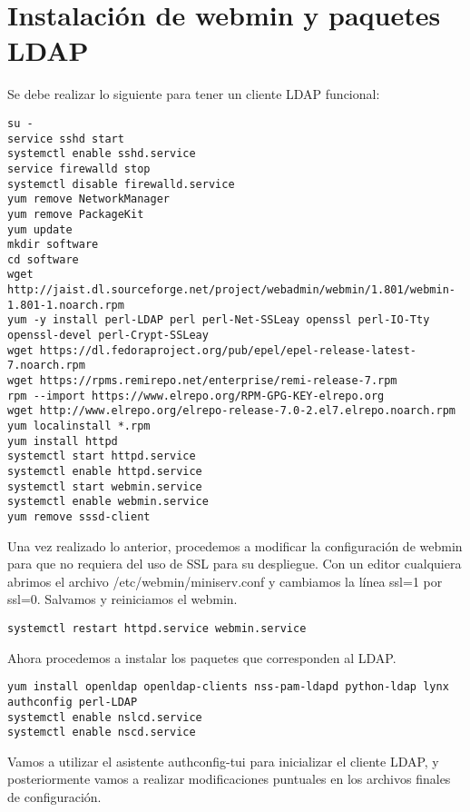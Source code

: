 \section{Instalación de webmin y paquetes LDAP}
Se debe realizar lo siguiente para tener un cliente LDAP funcional:
\begin{lstlisting} 
su -
service sshd start
systemctl enable sshd.service
service firewalld stop
systemctl disable firewalld.service
yum remove NetworkManager
yum remove PackageKit
yum update
mkdir software
cd software
wget http://jaist.dl.sourceforge.net/project/webadmin/webmin/1.801/webmin-1.801-1.noarch.rpm
yum -y install perl-LDAP perl perl-Net-SSLeay openssl perl-IO-Tty openssl-devel perl-Crypt-SSLeay
wget https://dl.fedoraproject.org/pub/epel/epel-release-latest-7.noarch.rpm
wget https://rpms.remirepo.net/enterprise/remi-release-7.rpm
rpm --import https://www.elrepo.org/RPM-GPG-KEY-elrepo.org
wget http://www.elrepo.org/elrepo-release-7.0-2.el7.elrepo.noarch.rpm
yum localinstall *.rpm
yum install httpd
systemctl start httpd.service
systemctl enable httpd.service
systemctl start webmin.service
systemctl enable webmin.service
yum remove sssd-client
\end{lstlisting}
Una vez realizado lo anterior, procedemos a modificar la configuración de webmin para que no requiera del uso de SSL para su despliegue. Con un editor cualquiera abrimos el archivo /etc/webmin/miniserv.conf y cambiamos la línea ssl=1 por ssl=0. Salvamos y reiniciamos el webmin.
\begin{lstlisting} 
systemctl restart httpd.service webmin.service
\end{lstlisting}
Ahora procedemos a instalar los paquetes que corresponden al LDAP.
\begin{lstlisting} 
yum install openldap openldap-clients nss-pam-ldapd python-ldap lynx authconfig perl-LDAP
systemctl enable nslcd.service
systemctl enable nscd.service
\end{lstlisting}
Vamos a utilizar el asistente authconfig-tui para inicializar el cliente LDAP, y posteriormente vamos a realizar modificaciones puntuales en los archivos finales de configuración.
